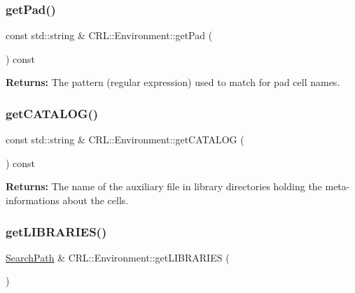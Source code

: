 \subsubsection{\texorpdfstring{get\+Pad()}{getPad()}}
{\footnotesize\ttfamily const std\+::string \& C\+R\+L\+::\+Environment\+::get\+Pad (\begin{DoxyParamCaption}{ }\end{DoxyParamCaption}) const\hspace{0.3cm}{\ttfamily [inline]}}

{\bfseries Returns\+:} The pattern (regular expression) used to match for pad cell names. \mbox{\label{classCRL_1_1Environment_a3bb5c9e02c1391142e439f023bdc0355}} 
\subsubsection{\texorpdfstring{get\+C\+A\+T\+A\+L\+O\+G()}{getCATALOG()}}
{\footnotesize\ttfamily const std\+::string \& C\+R\+L\+::\+Environment\+::get\+C\+A\+T\+A\+L\+OG (\begin{DoxyParamCaption}{ }\end{DoxyParamCaption}) const\hspace{0.3cm}{\ttfamily [inline]}}

{\bfseries Returns\+:} The name of the auxiliary file in library directories holding the meta-\/informations about the cells. \mbox{\label{classCRL_1_1Environment_acf7a3bc42cfb4b98f1da859ed27ca97e}} 
\subsubsection{\texorpdfstring{get\+L\+I\+B\+R\+A\+R\+I\+E\+S()}{getLIBRARIES()}}
{\footnotesize\ttfamily \hyperlink{classCRL_1_1SearchPath}{Search\+Path} \& C\+R\+L\+::\+Environment\+::get\+L\+I\+B\+R\+A\+R\+I\+ES (\begin{DoxyParamCaption}{ }\end{DoxyParamCaption})\hspace{0.3cm}{\ttfamily [inline]}}

